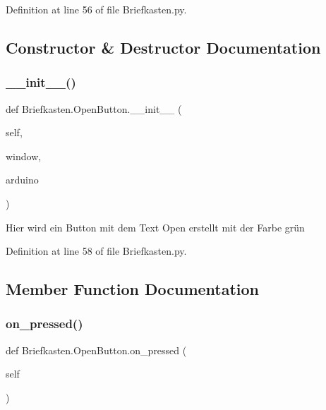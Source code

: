 Definition at line 56 of file Briefkasten.\+py.



\subsection{Constructor \& Destructor Documentation}
\mbox{\label{class_briefkasten_1_1_open_button_ae575ed28ea29c28d1c3f9c22e1e0c023}} 
\subsubsection{\texorpdfstring{\+\_\+\+\_\+init\+\_\+\+\_\+()}{\_\_init\_\_()}}
{\footnotesize\ttfamily def Briefkasten.\+Open\+Button.\+\_\+\+\_\+init\+\_\+\+\_\+ (\begin{DoxyParamCaption}\item[{}]{self,  }\item[{}]{window,  }\item[{}]{arduino }\end{DoxyParamCaption})}

\begin{DoxyVerb}Hier wird ein Button mit dem Text Open erstellt mit der Farbe grün\end{DoxyVerb}
 

Definition at line 58 of file Briefkasten.\+py.



\subsection{Member Function Documentation}
\mbox{\label{class_briefkasten_1_1_open_button_a8f6db25bcdf765089dde8e85540a0c86}} 
\subsubsection{\texorpdfstring{on\+\_\+pressed()}{on\_pressed()}}
{\footnotesize\ttfamily def Briefkasten.\+Open\+Button.\+on\+\_\+pressed (\begin{DoxyParamCaption}\item[{}]{self }\end{DoxyParamCaption})}



